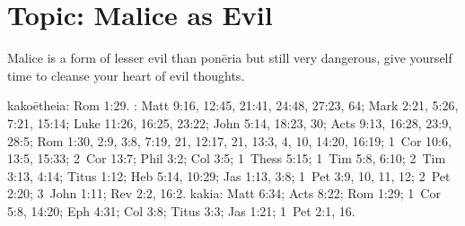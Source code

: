 \section{Topic: Malice as Evil}

Malice is a form of lesser evil than \gls{ponēria} but still very dangerous, give yourself time to cleanse your heart of evil thoughts. 

\gls{kakoētheia}: Rom 1:29. : Matt 9:16, 12:45, 21:41, 24:48, 27:23, 64; Mark 2:21, 5:26, 7:21, 15:14; Luke 11:26, 16:25, 23:22; John 5:14, 18:23, 30; Acts 9:13, 16:28, 23:9, 28:5; Rom 1:30, 2:9, 3:8, 7:19, 21, 12:17, 21, 13:3, 4, 10, 14:20, 16:19; 1~Cor 10:6, 13:5, 15:33; 2~Cor 13:7; Phil 3:2; Col 3:5; 1~Thess 5:15; 1~Tim 5:8, 6:10; 2~Tim 3:13, 4:14; Titus 1:12; Heb 5:14, 10:29; Jas 1:13, 3:8; 1~Pet 3:9, 10, 11, 12; 2~Pet 2:20; 3~John 1:11; Rev 2:2, 16:2. \gls{kakia}: Matt 6:34; Acts 8:22; Rom 1:29; 1~Cor 5:8, 14:20; Eph 4:31; Col 3:8; Titus 3:3; Jas 1:21; 1~Pet 2:1, 16.

